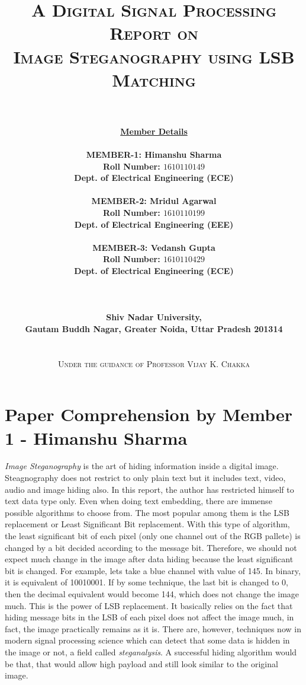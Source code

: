 \documentclass{report}
\title{\textsc{A Digital Signal Processing Report on \\ \Huge Image Steganography using LSB Matching}}
\author{\\\\ {\bf \underline{Member Details}} \\\\{\bf MEMBER-1: Himanshu Sharma} \\ {\bf Roll Number: $1610110149$} \\ {\bf Dept. of Electrical Engineering (ECE)} \\\\{\bf MEMBER-2: Mridul Agarwal} \\ {\bf Roll Number: $1610110199$} \\ {\bf Dept. of Electrical Engineering (EEE)} \\\\ {\bf MEMBER-3: Vedansh Gupta} \\ {\bf Roll Number: $1610110429$} \\ {\bf Dept. of Electrical Engineering (ECE)}\\\\\\\\ {\bf Shiv Nadar University,} \\ {\bf Gautam Buddh Nagar,  Greater Noida, Uttar Pradesh 201314} \\\\\\ \textsc{ Under the guidance of Professor Vijay K. Chakka}}
\date{}
\begin{document}
\maketitle
{}
\renewcommand{\thesection}{\arabic{section}}
\section{Paper Comprehension by Member 1 - Himanshu Sharma}
{\it Image Steganography} is the art of hiding information inside a digital image. Steagnography does not restrict to only plain text but it includes text, video, audio and image hiding also. In this report, the author has restricted himself to text data type only. Even when doing text embedding, there are immense possible algorithms to choose from. The most popular among them is the LSB replacement or Least Significant Bit replacement. With this type of algorithm, the least significant bit of each pixel (only one channel out of the RGB pallete) is changed by a bit decided according to the message bit. Therefore, we should not expect much change in the image after data hiding because the least significant bit is changed. For example, lets take a blue channel with value of 145. In binary, it is equivalent of 10010001. If by some technique, the last bit is changed to 0, then the decimal equivalent would become 144, which does not change the image much. This is the power of LSB replacement. It basically relies on the fact that hiding message bits in the LSB of each pixel does not affect the image much, in fact, the image practically remains as it is. There are, however, techniques now in modern signal processing science which can detect that some data is hidden in the image or not, a field called {\it steganalysis}. A successful hiding algorithm would be that, that would allow high payload and still look similar to the original image. 
\end{document}
